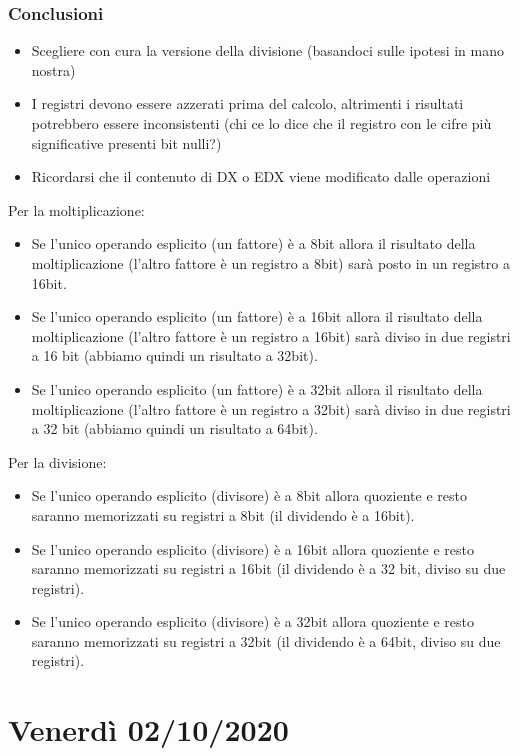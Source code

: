 \documentclass[11pt]{report}
\begin{document}
\subsection{Conclusioni}
\begin{itemize}
\item Scegliere con cura la versione della divisione (basandoci sulle ipotesi in mano nostra)
\item I registri devono essere azzerati prima del calcolo, altrimenti i risultati potrebbero essere inconsistenti (chi ce lo dice che il registro con le cifre più significative presenti bit nulli?)
\item Ricordarsi che il contenuto di DX o EDX viene modificato dalle operazioni
\end{itemize}
Per la moltiplicazione:
\begin{itemize}
\item Se l'unico operando esplicito (un fattore) è a 8bit allora il risultato della moltiplicazione (l'altro fattore è un registro a 8bit) sarà posto in un registro a 16bit.
\item Se l'unico operando esplicito (un fattore) è a 16bit allora il risultato della moltiplicazione (l'altro fattore è un registro a 16bit) sarà diviso in due registri a 16 bit (abbiamo quindi un risultato a 32bit).
\item Se l'unico operando esplicito (un fattore) è a 32bit allora il risultato della moltiplicazione (l'altro fattore è un registro a 32bit) sarà diviso in due registri a 32 bit (abbiamo quindi un risultato a 64bit).
\end{itemize}
Per la divisione:
\begin{itemize}
\item Se l'unico operando esplicito (divisore) è a 8bit allora quoziente e resto saranno memorizzati su registri a 8bit (il dividendo è a 16bit).
\item Se l'unico operando esplicito (divisore) è a 16bit allora quoziente e resto saranno memorizzati su registri a 16bit (il dividendo è a 32 bit, diviso su due registri).
\item Se l'unico operando esplicito (divisore) è a 32bit allora quoziente e resto saranno memorizzati su registri a 32bit (il dividendo è a 64bit, diviso su due registri).
\end{itemize}

\chapter{Venerdì 02/10/2020}
\end{document}
